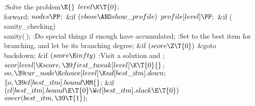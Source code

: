 \Y\B\4:Solve the problem\X${}\E{}$\6
$\\{level}\K\T{0};{}$\6
\4\\{forward}:\5
${}\\{nodes}\PP;{}$\6
\&{if} ${}(\\{vbose}\AND\\{show\_profile}){}$\1\5
${}\\{profile}[\\{level}]\PP;{}$\2\6
\&{if} (\\{sanity\_checking})\1\5
\\{sanity}(\,);\2\6
:Do special things if enough  have accumulated\X;\6
\*:Set  to the best item for branching, and let  be its branching degree\X;\6
\&{if} ${}(\\{score}\Z\T{0}){}$\1\5
\&{goto} \\{backdown};\2\6
\&{if} ${}(\\{score}\E\\{infty}){}$\1\5
:Visit a solution and \X;\2\6
${}\\{scor}[\\{level}]\K\\{score},\39\\{first\_tweak}[\\{level}]\K\T{0}{}$;\6
${}\\{oo},\39\\{cur\_node}\K\\{choice}[\\{level}]\K\\{nd}[\\{best\_itm}].%
\\{down};{}$\6
${}\|o,\39\\{cl}[\\{best\_itm}].\\{bound}\MM{}$;\6
\&{if} ${}(\\{cl}[\\{best\_itm}].\\{bound}\E\T{0}\W\\{cl}[\\{best\_itm}].%
\\{slack}\E\T{0}){}$\1\5
${}\\{cover}(\\{best\_itm},\39\T{1});{}$\2\6
